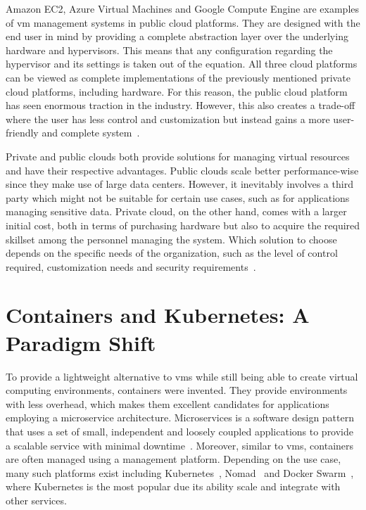 \documentclass{kththesis}
\begin{document}
Amazon EC2, Azure Virtual Machines and Google Compute Engine are examples of \Gls{vm} management systems in public cloud platforms. They are designed with the end user in mind by providing a complete abstraction layer over the underlying hardware and hypervisors. This means that any configuration regarding the hypervisor and its settings is taken out of the equation. All three cloud platforms can be viewed as complete implementations of the previously mentioned private cloud platforms, including hardware. For this reason, the public cloud platform has seen enormous traction in the industry.
However, this also creates a trade-off where the user has less control and customization but instead gains a more user-friendly and complete system\ \cite{public-private-cloud}.

Private and public clouds both provide solutions for managing virtual resources and have their respective advantages. Public clouds scale better performance-wise since they make use of large data centers. However, it inevitably involves a third party which might not be suitable for certain use cases, such as for applications managing sensitive data. Private cloud, on the other hand, comes with a larger initial cost, both in terms of purchasing hardware but also to acquire the required skillset among the personnel managing the system. Which solution to choose depends on the specific needs of the organization, such as the level of control required, customization needs and security requirements\ \cite{hybrid-cloud}. 

\section{Containers and Kubernetes: A Paradigm Shift}
\label{containers-kubernetes}
To provide a lightweight alternative to \Glspl{vm} while still being able to create virtual computing environments, containers were invented. They provide environments with less overhead, which makes them excellent candidates for applications employing a microservice architecture. Microservices is a software design pattern that uses a set of small, independent and loosely coupled applications to provide a scalable service with minimal downtime\ \cite{microservices-overview}. Moreover, similar to \Glspl{vm}, containers are often managed using a management platform. Depending on the use case, many such platforms exist including Kubernetes\ \cite{k8s-website}, Nomad\ \cite{nomad-website} and Docker Swarm\ \cite{docker-swarm-website}, where Kubernetes is the most popular due its ability scale and integrate with other services. 
\end{document}

